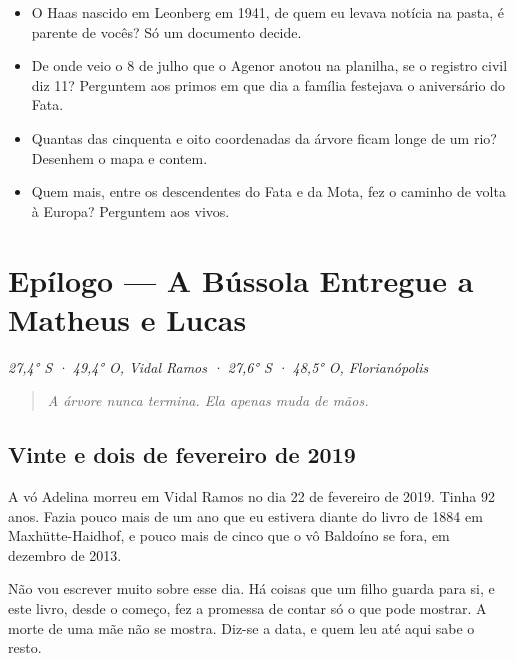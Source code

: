 \documentclass[
  brazilian,
  11pt,
  openany]{book}
\providecommand{\tightlist}{%
  \setlength{\itemsep}{0pt}\setlength{\parskip}{0pt}}
\begin{document}
\begin{itemize}
\tightlist
\item
  O Haas nascido em Leonberg em 1941, de quem eu levava notícia na
  pasta, é parente de vocês? Só um documento decide.
\item
  De onde veio o 8 de julho que o Agenor anotou na planilha, se o
  registro civil diz 11? Perguntem aos primos em que dia a família
  festejava o aniversário do Fata.
\item
  Quantas das cinquenta e oito coordenadas da árvore ficam longe de um
  rio? Desenhem o mapa e contem.
\item
  Quem mais, entre os descendentes do Fata e da Mota, fez o caminho de
  volta à Europa? Perguntem aos vivos.
\end{itemize}

\chapter*{Epílogo --- A Bússola Entregue a Matheus e
Lucas}\label{epilogo}

\emph{27,4° S · 49,4° O, Vidal Ramos · 27,6° S · 48,5° O, Florianópolis}

\begin{quote}
\emph{A árvore nunca termina. Ela apenas muda de mãos.}
\end{quote}

\section{Vinte e dois de fevereiro de
2019}\label{vinte-e-dois-de-fevereiro-de-2019}

A vó Adelina morreu em Vidal Ramos no dia 22 de fevereiro de 2019. Tinha
92 anos. Fazia pouco mais de um ano que eu estivera diante do livro de
1884 em Maxhütte-Haidhof, e pouco mais de cinco que o vô Baldoíno se
fora, em dezembro de 2013.

Não vou escrever muito sobre esse dia. Há coisas que um filho guarda
para si, e este livro, desde o começo, fez a promessa de contar só o que
pode mostrar. A morte de uma mãe não se mostra. Diz-se a data, e quem
leu até aqui sabe o resto.
\end{document}
